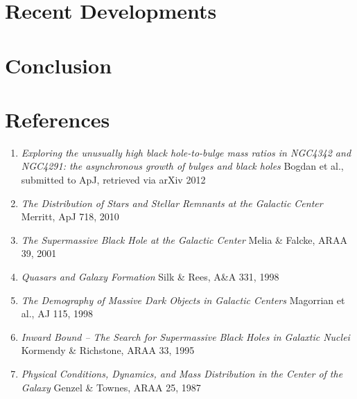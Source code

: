 \documentclass[12pt]{article}
\begin{document}
\section{Recent Developments}
\section{Conclusion}
\section*{References}
\begin{enumerate}
\item \textit{Exploring the unusually high black hole-to-bulge mass ratios in 
NGC4342 and NGC4291: the asynchronous growth of bulges and black holes} Bogdan 
et al.,  submitted to ApJ, retrieved via arXiv 2012
\item \textit{The Distribution of Stars and Stellar Remnants at the Galactic 
Center} Merritt, ApJ 718, 2010
\item \textit{The Supermassive Black Hole at the Galactic Center} Melia \& 
Falcke, ARAA 39, 2001
\item \textit{Quasars and Galaxy Formation} Silk \& Rees, A\&A 331, 1998
\item \textit{The Demography of Massive Dark Objects in Galactic Centers} 
Magorrian et al., AJ 115, 1998
\item \textit{Inward Bound -- The Search for Supermassive Black Holes in 
Galaxtic Nuclei} Kormendy \& Richstone, ARAA 33, 1995
\item \textit{Physical Conditions, Dynamics, and Mass Distribution in the Center
of the Galaxy} Genzel \& Townes, ARAA 25, 1987
\end{enumerate}
\end{document}
